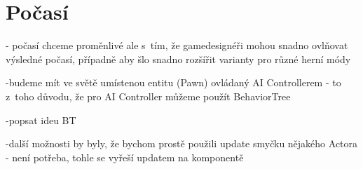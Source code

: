 
\section{Počasí}

- počasí chceme proměnlivé ale s~tím, že gamedesignéři mohou snadno ovlňovat výsledné počasí, případně aby šlo snadno rozšířit varianty pro různé herní módy

-budeme mít ve světě umístenou entitu (Pawn) ovládaný AI Controllerem - to z~toho důvodu, že pro AI Controller můžeme použít BehaviorTree

-popsat ideu BT

-další možnosti by byly, že bychom prostě použili update smyčku nějakého Actora - není potřeba, tohle se vyřeší updatem na komponentě